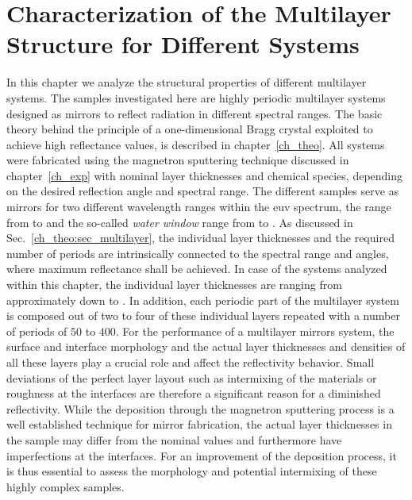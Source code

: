 \chapter{Characterization of the Multilayer Structure for Different Systems} \label{ch_spec}
In this chapter we analyze the structural properties of different multilayer systems. The samples investigated here are highly periodic multilayer systems designed as mirrors to reflect radiation in different spectral ranges. The basic theory behind the principle of a one-dimensional Bragg crystal exploited to achieve high reflectance values, is described in chapter~\ref{ch_theo}. All systems were fabricated using the magnetron sputtering technique discussed in chapter~\ref{ch_exp} with nominal layer thicknesses and chemical species, depending on the desired reflection angle and spectral range. The different samples serve as mirrors for two different wavelength ranges within the \gls{euv} spectrum, the range from  to  and the so-called \emph{water window} range from  to . As discussed in Sec.~\ref{ch_theo:sec_multilayer}, the individual layer thicknesses and the required number of periods are intrinsically connected to the spectral range and angles, where maximum reflectance shall be achieved. In case of the systems analyzed within this chapter, the individual layer thicknesses are ranging from approximately  down to . In addition, each periodic part of the multilayer system is composed out of two to four of these individual layers repeated with a number of periods of $50$ to $400$. For the performance of a multilayer mirrors system, the surface and interface morphology and the actual layer thicknesses and densities of all these layers play a crucial role and affect the reflectivity behavior. Small deviations of the perfect layer layout such as intermixing of the materials or roughness at the interfaces are therefore a significant reason for a diminished reflectivity. While the deposition through the magnetron sputtering process is a well established technique for mirror fabrication, the actual layer thicknesses in the sample may differ from the nominal values and furthermore have imperfections at the interfaces. For an improvement of the deposition process, it is thus essential to assess the morphology and potential intermixing of these highly complex samples.

